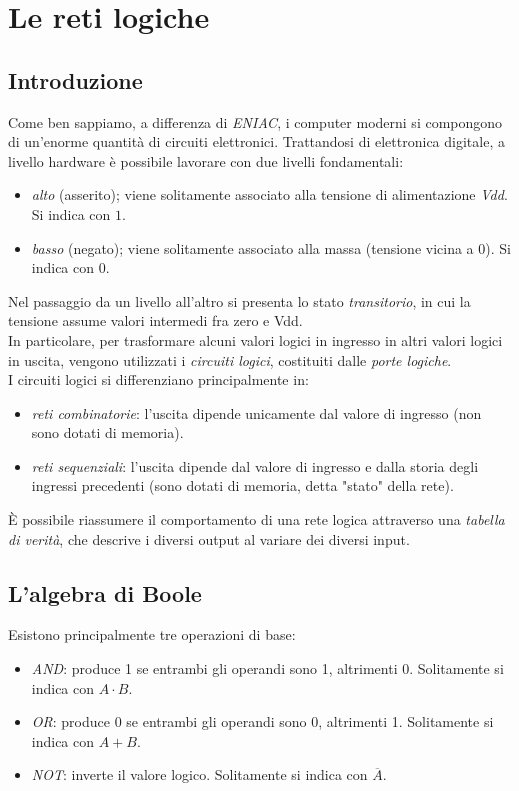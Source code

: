 \documentclass[class=book, crop=false, oneside]{standalone}
\begin{document}
\chapter{Le reti logiche}
\section{Introduzione}
Come ben sappiamo, a differenza di \emph{ENIAC}, i computer moderni si compongono di un'enorme quantità di circuiti elettronici. Trattandosi di elettronica digitale, a livello hardware è possibile lavorare con due livelli fondamentali:
\begin{itemize}
	\item \emph{alto} (asserito); viene solitamente associato alla tensione di alimentazione \emph{Vdd}. Si indica con \(1\).
	\item \emph{basso} (negato); viene solitamente associato alla massa (tensione vicina a 0). Si indica con \(0\).
\end{itemize}
Nel passaggio da un livello all'altro si presenta lo stato \emph{transitorio}, in cui la tensione assume valori intermedi fra zero e Vdd.\\
In particolare, per trasformare alcuni valori logici in ingresso in altri valori logici in uscita, vengono utilizzati i \emph{circuiti logici}, costituiti dalle \emph{porte logiche}.\\
I circuiti logici si differenziano principalmente in:
\begin{itemize}
	\item \emph{reti combinatorie}: l'uscita dipende unicamente dal valore di ingresso (non sono dotati di memoria).
	\item \emph{reti sequenziali}: l'uscita dipende dal valore di ingresso e dalla storia degli ingressi precedenti (sono dotati di memoria, detta "stato" della rete).
\end{itemize}
\`{E} possibile riassumere il comportamento di una rete logica attraverso una \emph{tabella di verità}, che descrive i diversi output al variare dei diversi input.

\section{L'algebra di Boole}
Esistono principalmente tre operazioni di base:
\begin{itemize}
	\item \emph{AND}: produce 1 se entrambi gli operandi sono 1, altrimenti 0. Solitamente si indica con \(A\cdot B\).
	\item \emph{OR}: produce 0 se entrambi gli operandi sono 0, altrimenti 1. Solitamente si indica con \(A+B\).
	\item \emph{NOT}: inverte il valore logico. Solitamente si indica con \(\overline{A}\).
\end{itemize}
\end{document}
